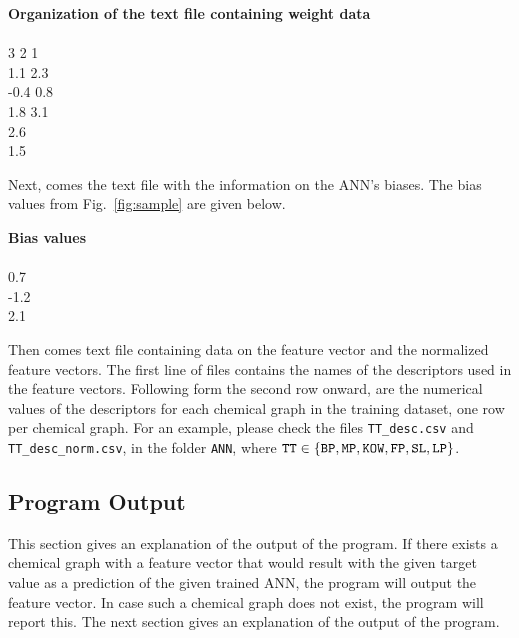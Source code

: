 \documentclass[11pt, titlepage, dvipdfmx, twoside]{article}
\begin{document}
\bigskip

\begin{oframed}
{\bf Organization of the text file containing weight data}\\\\
3 2 1\\
1.1 2.3\\
-0.4 0.8\\
1.8 3.1\\
2.6\\
1.5\\
\end{oframed}

\bigskip


Next, comes the text file with the information on the ANN's biases.
The bias values from Fig.~\ref{fig:sample} are given below.

\bigskip

\begin{oframed}
{\bf Bias values}\\\\
0.7\\
-1.2\\
2.1\\
\end{oframed}

\bigskip

Then comes text file containing data on the feature vector and the normalized feature vectors.
The first line of files contains the names of the descriptors used in the feature vectors.
Following form the second row onward, are the numerical values of the descriptors for each chemical graph
in the training dataset, one row per chemical graph.
For an example, please check the files  {\tt TT\_desc.csv} and {\tt TT\_desc\_norm.csv},  in the folder {\tt ANN},
where ${\tt TT} \in \{{\tt BP, MP, KOW, FP, SL, LP}\}$.





\subsection{Program Output}
\label{sec:section3_3}

This section gives an explanation of the output of the program.
If there exists a chemical graph with a feature vector that
would result with the given target value as a prediction of
the given trained ANN, the program will output the feature vector.
In case such a chemical graph does not exist, the program will report this.
The next section gives an explanation of the output of the program.
\end{document}
